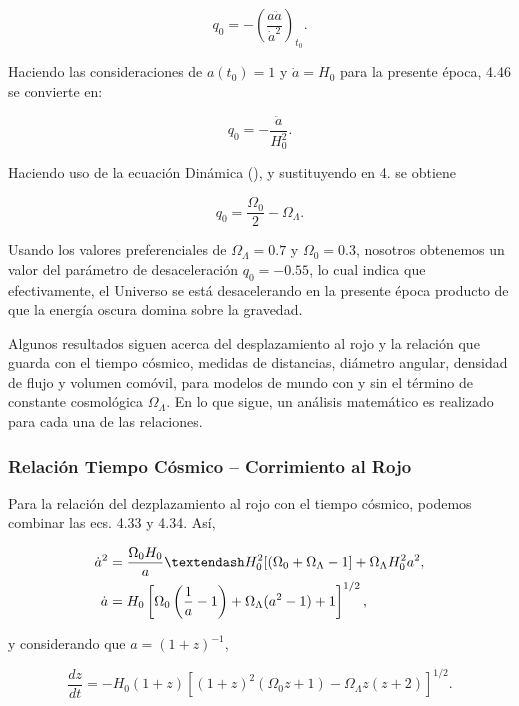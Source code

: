 \documentclass[11pt]{article}
\begin{document}
    \begin{equation}
        q_0= - \left( \frac{a\ddot{a}}{\dot{a}^2}\right)_{t_0}.
    \end{equation}
    
    Haciendo las consideraciones de $a(t_0)=1$ y $\dot{a}=H_0$ para la presente época, 4.46 se convierte en: 
    
    \begin{equation}
        q_0= - \frac{\ddot{a}}{H_0^2}.
    \end{equation}
    
    
    Haciendo uso de la ecuación Dinámica (), y sustituyendo en 4. se obtiene

\begin{equation}
	q_0 = \frac{\Omega_0}{2} - \Omega_{\Lambda}.
\end{equation}

Usando los valores preferenciales de $\Omega_{\Lambda} = 0.7$ y $\Omega_0 = 0.3$, nosotros obtenemos un valor del parámetro de desaceleración $q_0 = -0.55$, lo cual indica que efectivamente, el Universo se está desacelerando en la presente época producto de que la energía oscura domina sobre la gravedad. 

Algunos resultados siguen acerca del desplazamiento al rojo y la relación que guarda con el tiempo cósmico, medidas de distancias, diámetro angular, densidad de flujo y volumen comóvil, para modelos de mundo con y sin el término de constante cosmológica $\Omega_{\Lambda}$. En lo que sigue, un análisis matemático es realizado para cada una de las relaciones. 

\subsubsection{Relación Tiempo Cósmico – Corrimiento al Rojo}

Para la relación del dezplazamiento al rojo con el tiempo cósmico, podemos combinar las ecs. 4.33 y 4.34. Así, 

    \begin{align}
	    \dot{a}^2 &= \frac{\Omega_0 H_0}{a} – H_0^2 [(\Omega_0 + \Omega_{\Lambda} -1] +  \Omega_{\Lambda}H_0^2 a^2, \notag \\
	    \dot{a} & = H_0 \left[ \Omega_0 \left( \frac{1}{a} - 1 \right) + \Omega_{\Lambda}(a^2 - 1) + 1 \right]^{1/2},
    \end{align}

y considerando que $a = (1+z)^{-1}$,

    \begin{equation}
	    \frac{dz}{dt} = - H_0(1+z) [ (1+z)^2 (\Omega_0 z + 1) - \Omega_{\Lambda} z (z+2) ]^{1/2}.
    \end{equation}
\end{document}
